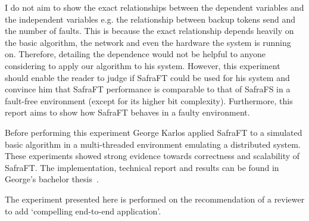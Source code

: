I do not aim to show the exact relationships between the dependent variables and the independent variables e.g. the relationship between backup tokens send and the number of faults.
This is because the exact relationship depends heavily on the basic algorithm, the network and even the hardware the system is running on.
Therefore, detailing the dependence would not be helpful to anyone considering to apply our algorithm to his system.
However, this experiment should enable the reader to judge if SafraFT could be used for his system and convince him that SafraFT performance is comparable to that of SafraFS in a fault-free environment (except for its higher bit complexity).
Furthermore, this report aims to show how SafraFT behaves in a faulty environment.

\begin{comment}
Hypothesis
Safra compares to safra without signficant changes in with no failures on all network sizes
tokens
tokens after termination

no signifcant change in token forwarding
time ??
no hard, complicated computations
time after termination
no hard, complicated computations and no change in token forwarding

our Safra has higher bit complexity 
increases linearly with network size network size of 1 == then upwards linearly

Influence from faults
backup tokens == number of faults - not correct
difference caused by backup tokens / network size under same fault conditions?
reason:  // Not to write here
node gets to know about failing node because of token
e.g. if its a bit further out and it gets the crashed message later
node crash behind each other in the ring and only one backup token is send?
Token count increases for a low level of faults as it colors nodes black and incurs in further rounds when node detects crash or when nodes gets to know of crash of successor    x
These are mostly done during computation because CM is not processing heavy and gets passive a lot
-> No change on tokens after termination
Token count and time decrease for a high level of fault as network size is reduced. 
Same for time spent

Average token size grows as the crashes are propagated by the token each of them takes one round so impact on average token size depends on network size and the signficance also on number of rounds
more noticable for many faults but than there are also less tokens also in that round
\end{comment}



Before performing this experiment George Karlos applied SafraFT to a simulated basic algorithm in a multi-threaded environment emulating a distributed system.
These experiments showed strong evidence towards correctness and scalability of SafraFT.
The implementation, technical report and results can be found in George's bachelor thesis~\cite{karlos}.

The experiment presented here is performed on the recommendation of a reviewer to add `compelling end-to-end application'.
